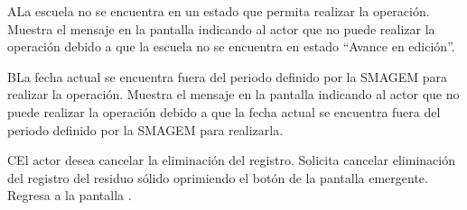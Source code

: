     \begin{UCtrayectoriaA}{A}{La escuela no se encuentra en un estado que permita realizar la operación.}
    \UCpaso[\UCsist] Muestra el mensaje  en la pantalla  indicando al actor que no puede realizar la operación debido a que la escuela no se encuentra en estado ``Avance en edición''. 
 \end{UCtrayectoriaA}
 
    \begin{UCtrayectoriaA}{B}{La fecha actual se encuentra fuera del periodo definido por la SMAGEM para realizar la operación.}
    \UCpaso[\UCsist] Muestra el mensaje  en la pantalla  indicando al actor que no puede realizar la operación  debido a que la fecha actual se encuentra fuera del periodo definido por la SMAGEM para realizarla. 
 \end{UCtrayectoriaA}
 
    \begin{UCtrayectoriaA}{C}{El actor desea cancelar la eliminación del registro.}
    \UCpaso[\UCactor] Solicita cancelar eliminación del registro del residuo sólido oprimiendo el botón  de la pantalla emergente.
    \UCpaso[] Regresa a la pantalla .    
 \end{UCtrayectoriaA}
